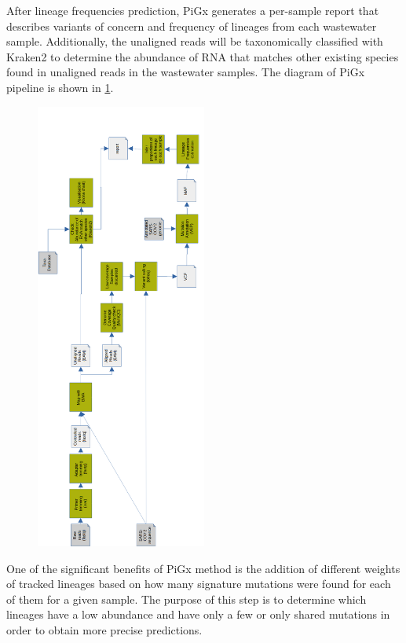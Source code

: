         After lineage frequencies prediction, PiGx generates a per-sample report that describes variants of concern and frequency of lineages from each wastewater sample. Additionally, the unaligned reads will be taxonomically classified with Kraken2 \cite{wood2014,wood2019,lu2020} to determine the abundance of RNA that matches other existing species found in unaligned reads in the wastewater samples. The diagram of PiGx pipeline is shown in \cref{fig:prior:pigx}.
        
        \begin{figure}[h]
        	\centering
            \includegraphics[width=0.5\textwidth]{figures/prior/pigx_vertical.png}
            \label{fig:prior:pigx}
        \end{figure}
        
        One of the significant benefits of PiGx method is the addition of different weights of tracked lineages based on how many signature mutations were found for each of them for a given sample. The purpose of this step is to determine which lineages have a low abundance and have only a few or only shared mutations in order to obtain more precise predictions. 

